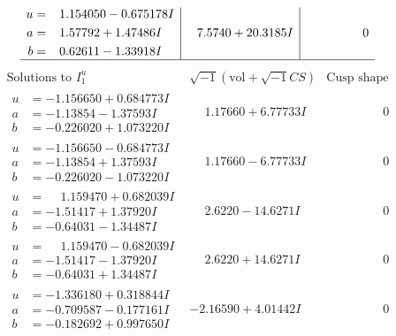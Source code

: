 \documentclass[1p]{elsarticle_modified}
\theoremstyle{definition}
\newcommand{\I}{\sqrt{-1}}
\begin{document}
$$\begin{array}{c|c|c}
\begin{aligned}
u &= \phantom{-}1.154050 - 0.675178 I \\
a &= \phantom{-}1.57792 + 1.47486 I \\
b &= \phantom{-}0.62611 - 1.33918 I\end{aligned}
 & \phantom{-}7.5740 + 20.3185 I & \phantom{-0.000000 } 0\\
 \hline 
 \end{array}$$\newpage$$\begin{array}{c|c|c}  
\text{Solutions to }I^u_{1}& \I (\text{vol} + \sqrt{-1}CS) & \text{Cusp shape}\\
 \hline 
\begin{aligned}
u &= -1.156650 + 0.684773 I \\
a &= -1.13854 - 1.37593 I \\
b &= -0.226020 + 1.073220 I\end{aligned}
 & \phantom{-}1.17660 + 6.77733 I & \phantom{-0.000000 } 0 \\ \hline\begin{aligned}
u &= -1.156650 - 0.684773 I \\
a &= -1.13854 + 1.37593 I \\
b &= -0.226020 - 1.073220 I\end{aligned}
 & \phantom{-}1.17660 - 6.77733 I & \phantom{-0.000000 } 0 \\ \hline\begin{aligned}
u &= \phantom{-}1.159470 + 0.682039 I \\
a &= -1.51417 + 1.37920 I \\
b &= -0.64031 - 1.34487 I\end{aligned}
 & \phantom{-}2.6220 - 14.6271 I & \phantom{-0.000000 } 0 \\ \hline\begin{aligned}
u &= \phantom{-}1.159470 - 0.682039 I \\
a &= -1.51417 - 1.37920 I \\
b &= -0.64031 + 1.34487 I\end{aligned}
 & \phantom{-}2.6220 + 14.6271 I & \phantom{-0.000000 } 0 \\ \hline\begin{aligned}
u &= -1.336180 + 0.318844 I \\
a &= -0.709587 - 0.177161 I \\
b &= -0.182692 + 0.997650 I\end{aligned}
 & -2.16590 + 4.01442 I & \phantom{-0.000000 } 0 \\ \hline\begin{aligned}

\end{aligned}
\end{array}$$
\end{document}
